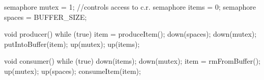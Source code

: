 \documentclass[varwidth=28em,crop]{standalone}
\begin{document}
\begin{ccode}
semaphore mutex = 1; //controls access to c.r.
semaphore items = 0;
semaphore spaces = BUFFER_SIZE;        
\end{ccode}
\begin{minipage}{.42\linewidth}
\vspace{1em}
\begin{ccode}
void producer() {
  while (true) {
    item = produceItem();
    down(spaces);
    down(mutex);
    putIntoBuffer(item);
    up(mutex);
    up(items);
  }
}      
\end{ccode}
\end{minipage}\qquad
\begin{minipage}{.48\linewidth}
\vspace{1em}
\begin{ccode}
void consumer() {
  while (true) {
    down(items);
    down(mutex);
    item = rmFromBuffer();
    up(mutex);
    up(spaces);
    consumeItem(item);
  }
}      
\end{ccode}
\end{minipage}
\end{document}
